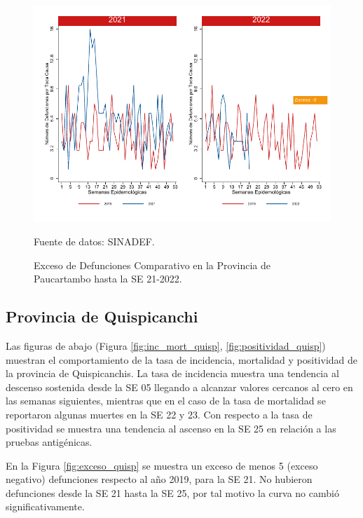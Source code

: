 \documentclass[12pt,a4paper,openany]{book}
\begin{document}
	\begin{figure}[h]
		\caption{Exceso de Defunciones Comparativo en la Provincia de Paucartambo hasta la SE 21-2022.}\label{fig:exceso_paucartam}
		\begin{center}
			\includegraphics[width=0.7\linewidth]{../figuras/exceso_11.pdf}
		\end{center}
		{\footnotesize {Fuente de datos: SINADEF.}}
	\end{figure}
	
	\clearpage
	
	\subsection*{Provincia de Quispicanchi}
	\noindent Las figuras de abajo (Figura \ref{fig:inc_mort_quisp}, \ref{fig:positividad_quisp}) muestran el comportamiento de la tasa de incidencia, mortalidad y positividad de la provincia de Quispicanchis. La tasa de incidencia muestra una tendencia al descenso sostenida desde la SE 05 llegando a alcanzar valores cercanos al cero en las semanas siguientes, mientras que en el caso de la tasa de mortalidad se reportaron algunas muertes en la SE 22 y 23. Con respecto a la tasa de positividad se muestra una tendencia al ascenso en la SE 25 en relación a las pruebas antigénicas.
	
	En la Figura \ref{fig:exceso_quisp} se muestra un exceso de menos 5 (exceso negativo) defunciones respecto al año 2019, para la SE 21. No hubieron defunciones desde la SE 21 hasta la SE 25, por tal motivo la curva no cambió significativamente.
	
\end{document}

